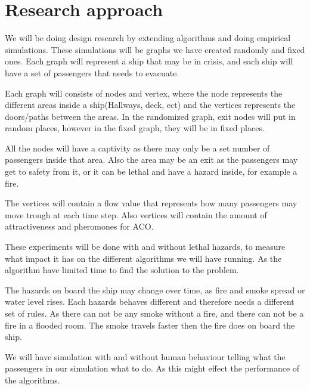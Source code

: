 \chapter{Research approach}
\label{ch:approach}




We will be doing design research by extending algorithms and doing empirical simulations. These simulations will be graphs we have created randomly and fixed ones. Each graph will represent a ship that may be in crisis, and each ship will have a set of passengers that needs to evacuate.



Each graph will consists of nodes and vertex, where the node represents the different areas inside a ship(Hallways, deck, ect) and the vertices represents the doors/paths between the areas. In the randomized graph, exit nodes will put in random places, however in the fixed graph, they will be in fixed places. 

All the nodes will have a captivity as there may only be a set number of passengers inside that area. Also the area may be an exit as the passengers may get to safety from it, or it can be lethal and have a hazard inside, for example a fire.

The vertices will contain a flow value that represents how many passengers may move trough at each time step. Also vertices will contain the amount of attractiveness and pheromones for ACO.

These experiments will be done with and without lethal hazards, to measure what impact it has on the different algorithms we will have running. As the algorithm have limited time to find the solution to the problem.

The hazards on board the ship may change over time, as fire and smoke spread or water level rises. Each hazards behaves different and therefore needs a different set of rules. As there can not be any smoke without a fire, and there can not be a fire in a flooded room. The smoke travels faster then the fire does on board the ship.

We will have simulation with and without human behaviour telling what the passengers in our simulation what to do. As this might effect the performance of the algorithms.

